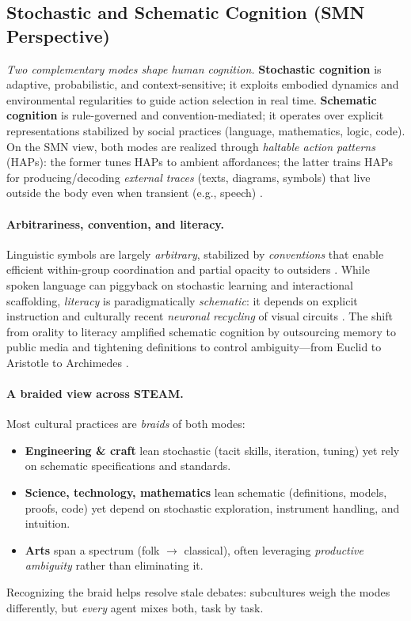 \subsection{Stochastic and Schematic Cognition (SMN Perspective)}
\label{subsec:stochastic_schematic}

\textit{Two complementary modes shape human cognition.} 
\textbf{Stochastic cognition} is adaptive, probabilistic, and context-sensitive; it exploits embodied dynamics and environmental regularities to guide action selection in real time. 
\textbf{Schematic cognition} is rule-governed and convention-mediated; it operates over explicit representations stabilized by social practices (language, mathematics, logic, code). 
On the SMN view, both modes are realized through \emph{haltable action patterns} (HAPs): the former tunes HAPs to ambient affordances; the latter trains HAPs for producing/decoding \emph{external traces} (texts, diagrams, symbols) that live outside the body even when transient (e.g., speech) \citep{PezzuloCisek2016Affordance,Donald1991Origins,ClarkChalmers1998Extended}.

\paragraph{Arbitrariness, convention, and literacy.}
Linguistic symbols are largely \emph{arbitrary}, stabilized by \emph{conventions} that enable efficient within-group coordination and partial opacity to outsiders \citep{Hockett1960OriginSpeech,Lewis1969Convention}. 
While spoken language can piggyback on stochastic learning and interactional scaffolding, \emph{literacy} is paradigmatically \emph{schematic}: it depends on explicit instruction and culturally recent \emph{neuronal recycling} of visual circuits \citep{Dehaene2009Reading,DehaeneCohen2007CulturalRecycling}. 
The shift from orality to literacy amplified schematic cognition by outsourcing memory to public media and tightening definitions to control ambiguity---from Euclid to Aristotle to Archimedes \citep{Donald1991Origins,Gardenfors2004ConceptualSpaces,Gardenfors2014Geometry}.

\paragraph{A braided view across STEAM.}
Most cultural practices are \emph{braids} of both modes:
\begin{itemize}
  \item \textbf{Engineering \& craft} lean stochastic (tacit skills, iteration, tuning) yet rely on schematic specifications and standards.
  \item \textbf{Science, technology, mathematics} lean schematic (definitions, models, proofs, code) yet depend on stochastic exploration, instrument handling, and intuition.
  \item \textbf{Arts} span a spectrum (folk $\rightarrow$ classical), often leveraging \emph{productive ambiguity} rather than eliminating it.
\end{itemize}
Recognizing the braid helps resolve stale debates: subcultures weigh the modes differently, but \emph{every} agent mixes both, task by task.

